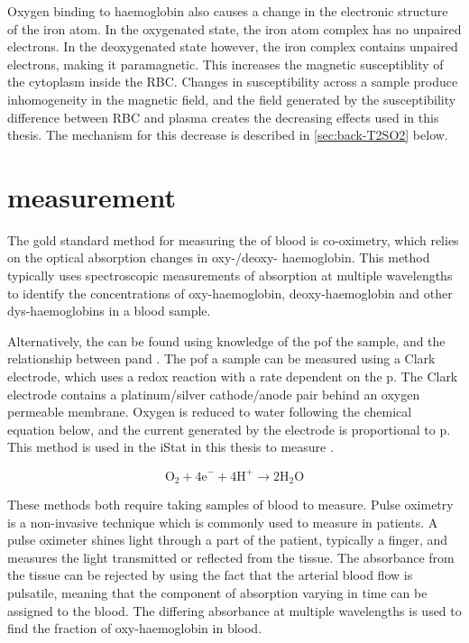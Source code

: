 Oxygen binding to haemoglobin also causes a change in the electronic structure of the iron atom. \cite{PaulingMagneticPropertiesStructure1936}
In the oxygenated state, the iron atom complex has no unpaired electrons.
In the deoxygenated state however, the iron complex contains unpaired electrons, making it paramagnetic.
This increases the magnetic susceptiblity of the cytoplasm inside the RBC.
Changes in susceptibility across a sample produce inhomogeneity in the \Bzero magnetic field, and the field generated by the susceptibility difference between RBC and plasma creates the decreasing \Ttwo effects used in this thesis.
The mechanism for this decrease is described in \autoref{sec:back-T2SO2} below.

\section{\SOtwo measurement}
\label{sec:back-pulseox}
The gold standard method for measuring the \SOtwo of blood is co-oximetry, which relies on the optical absorption changes in oxy-/deoxy- haemoglobin\cite{ToffalettiMisconceptionsreportingoxygen2007}.
This method typically uses spectroscopic measurements of absorption at multiple wavelengths to identify the concentrations of oxy-haemoglobin, deoxy-haemoglobin and other dys-haemoglobins in a blood sample.

Alternatively, the \SOtwo can be found using knowledge of the p\Otwo of the sample, and the relationship between p\Otwo and \SOtwo.
The p\Otwo of a sample can be measured using a Clark electrode, which uses a redox reaction with a rate dependent on the p\Otwo.
The Clark electrode contains a platinum/silver cathode/anode pair behind an oxygen permeable membrane.
Oxygen is reduced to water following the chemical equation below, and the current generated by the electrode is proportional to p\Otwo.
This method is used in the iStat in this thesis to measure \SOtwo.

\begin{equation}
\mathrm{O}_2 + \mathrm{4e}^- + \mathrm{4 H}^+ \rightarrow \mathrm{2H}_2\mathrm{O}
\label{eq:ClarkO2}
\end{equation}

These methods both require taking samples of blood to measure.
Pulse oximetry is a non-invasive technique which is commonly used to measure \SOtwo in patients.
A pulse oximeter shines light through a part of the patient, typically a finger, and measures the light transmitted or reflected from the tissue.
The absorbance from the tissue can be rejected by using the fact that the arterial blood flow is pulsatile, meaning that the component of absorption varying in time can be assigned to the blood. \cite{WiebenLightAbsorbancePulse1997}
The differing absorbance at multiple wavelengths is used to find the fraction of oxy-haemoglobin in blood.

